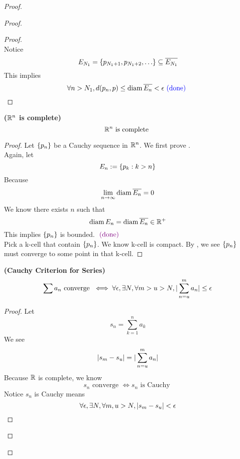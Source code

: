 \documentclass{report}
\begin{document}
\begin{proof}
\begin{proof}
\begin{proof}
\begin{equation}
\end{equation}
Notice
\begin{equation}
E_{N_1}=\set{p_{N_1+1},p_{N_1+2},\dots }\subseteq \overline{E_{N_1}}
\end{equation}
This implies 
\begin{equation}
\forall n>N_1, d(p_n,p)\leq \text{diam}\, \overline{E_n}<\epsilon \textcolor{blue}{\text{ (done) }}
\end{equation}
\end{proof}
\begin{corollary}
\label{3.9.9}
\textbf{($\mathbb{R}^n$ is complete)}
\begin{equation}
\mathbb{R}^n\text{ is complete }
\end{equation}
\end{corollary}
\begin{proof}
Let $\{ p_n \}$ be a Cauchy sequence in $\mathbb{R}^n$. We first prove .\\

Again, let
\begin{equation}
E_n:=\{ p_k:k>n \}
\end{equation}
Because 
\begin{equation}
\lim_{n\to\infty}\text{diam}\, \overline{E_n}=0
\end{equation}
We know there exists $n$ such that
 \begin{equation}
\text{diam}\, E_n=\text{diam}\, \overline{E_n}\in\mathbb{R}^+
\end{equation}
This implies $\{ p_n \}$ is bounded. $\textcolor{violet}{\text{ (done) }}$\\

Pick a k-cell that contain $\{ p_n \}$. We know k-cell is compact. By , we see $\{ p_n \}$ must converge to some point in that k-cell.
\end{proof}
\begin{corollary}
\label{3.9.10}
\textbf{(Cauchy Criterion for Series)}  
\begin{equation}
\sum a_n\text{ converge }\iff \forall \epsilon ,\exists N, \forall m>u>N, |\sum_{n=u}^m a_n|\leq \epsilon 
\end{equation}
\end{corollary}
\begin{proof}
Let 
 \begin{equation}
s_n=\sum_{k=1}^n a_k
\end{equation}
We see 
\begin{equation}
  |s_m-s_u|=|\sum_{n=u}^m a_n|
\end{equation}
Because $\mathbb{R}$ is complete, we know 
 \begin{equation}
s_n\text{ converge }\iff  s_n\text{ is Cauchy }
\end{equation}
Notice $s_n$ is Cauchy means 
 \begin{equation}
\forall \epsilon, \exists N, \forall m,u>N, |s_m-s_u|<\epsilon 
\end{equation}
\end{proof}

\end{proof}
\end{proof}
\end{document}
